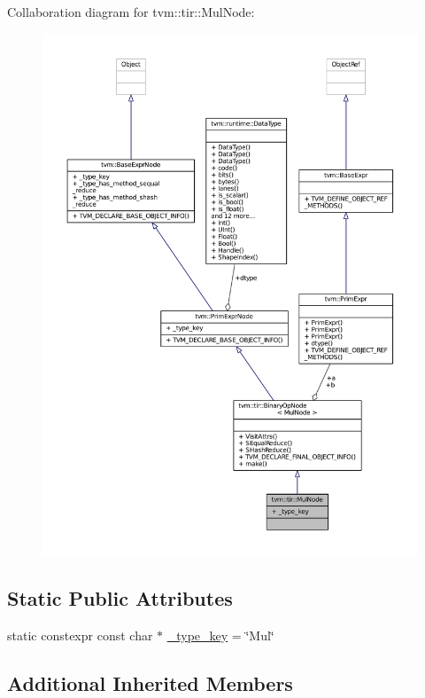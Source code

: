Collaboration diagram for tvm\+:\+:tir\+:\+:Mul\+Node\+:
\nopagebreak
\begin{figure}[H]
\begin{center}
\leavevmode
\includegraphics[width=350pt]{classtvm_1_1tir_1_1MulNode__coll__graph}
\end{center}
\end{figure}
\subsection*{Static Public Attributes}
\begin{DoxyCompactItemize}
\item 
static constexpr const char $\ast$ \hyperlink{classtvm_1_1tir_1_1MulNode_ab8b1b845628226529c395872c18e1b40}{\+\_\+type\+\_\+key} = \char`\"{}Mul\char`\"{}
\end{DoxyCompactItemize}
\subsection*{Additional Inherited Members}


